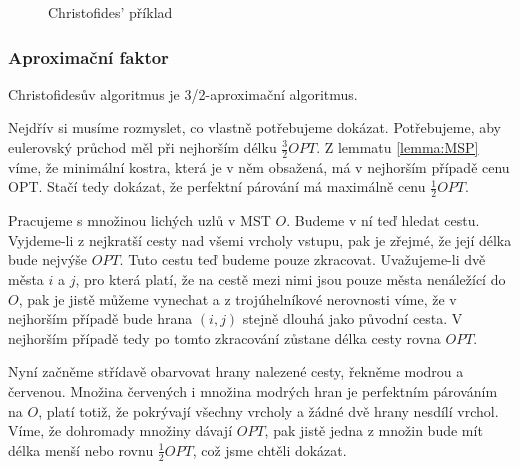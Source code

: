 \documentclass[
  biblatex,
  figures=false,
  glossaries,
  index
]{kidiplom}
\begin{document}
\begin{figure}[H]
\begin{example}
    \end{example}
    \caption{Christofides' příklad}
\end{figure}

\subsubsection{Aproximační faktor}
\begin{theorem}
	Christofidesův algoritmus  je 3/2-aproximační algoritmus.
\end{theorem}

	Nejdřív si musíme rozmyslet, co vlastně potřebujeme dokázat. Potřebujeme, aby eulerovský průchod měl při nejhorším délku $\frac{3}{2}OPT$. Z lemmatu \ref{lemma:MSP} víme, že minimální kostra, která je v něm obsažená, má v nejhorším případě cenu OPT. Stačí tedy dokázat, že perfektní párování má maximálně cenu $\frac{1}{2} OPT$.
	
	Pracujeme s množinou lichých uzlů v MST $O$. Budeme v ní teď hledat cestu. Vyjdeme-li z nejkratší cesty nad všemi vrcholy vstupu, pak je zřejmé, že její délka bude nejvýše $OPT$. Tuto cestu teď budeme pouze zkracovat. Uvažujeme-li dvě města $i$ a $j$, pro která platí, že na cestě mezi nimi jsou pouze města nenáležící do $O$, pak je jistě můžeme vynechat a z trojúhelníkové nerovnosti víme, že v nejhorším případě bude hrana $(i,j)$ stejně dlouhá jako původní cesta. V nejhorším případě tedy po tomto zkracování zůstane délka cesty rovna $OPT$.
	
	Nyní začněme střídavě obarvovat hrany nalezené cesty, řekněme modrou a červenou. Množina červených i množina modrých hran je perfektním párováním na $O$, platí totiž, že pokrývají všechny vrcholy a žádné dvě hrany nesdílí vrchol. Víme, že dohromady množiny dávají $OPT$, pak jistě jedna z množin bude mít délka menší nebo rovnu $\frac{1}{2}OPT$, což jsme chtěli dokázat.
\end{document}
